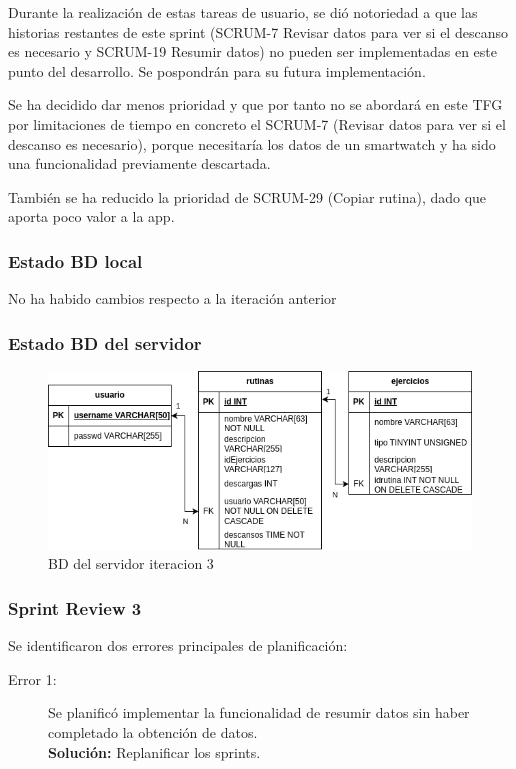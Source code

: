 Durante la realización de estas tareas de usuario, se dió notoriedad a que las historias restantes de este sprint (SCRUM-7 Revisar datos para ver si el descanso es necesario y SCRUM-19 Resumir datos) no pueden ser implementadas en este punto del desarrollo. Se pospondrán para su futura implementación.

Se ha decidido dar menos prioridad y que por tanto no se abordará en este TFG por limitaciones de tiempo en concreto el SCRUM-7 (Revisar datos para ver si el descanso es necesario), porque necesitaría los datos de un smartwatch y ha sido una funcionalidad previamente descartada.

También se ha reducido la prioridad de SCRUM-29 (Copiar rutina), dado que aporta poco valor a la app.

\subsubsection{Estado BD local}

No ha habido cambios respecto a la iteración anterior

\subsubsection{Estado BD del servidor}

\begin{figure}[H]
   \centering
    \includegraphics[width=\textwidth]{fotos/BD be iteracion 3.png}
    \caption{BD del servidor iteracion 3}
    \label{fig:BD be iteracion 3}
\end{figure}

\subsubsection{Sprint Review 3}

Se identificaron dos errores principales de planificación:

\begin{description}
  \item[Error 1:] Se planificó implementar la funcionalidad de resumir datos sin haber completado la obtención de datos. \\ \textbf{Solución:} Replanificar los sprints.
\end{description}

